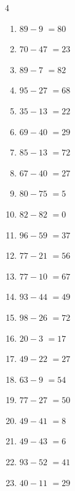 \begin{multicols}{4}
\begin{enumerate}
  \item $89-9$
        $=80$

  \item $70-47$
        $=23$

  \item $89-7$
        $=82$

  \item $95-27$
        $=68$

  \item $35-13$
        $=22$

  \item $69-40$
        $=29$

  \item $85-13$
        $=72$

  \item $67-40$
        $=27$

  \item $80-75$
        $=5$

  \item $82-82$
        $=0$

  \item $96-59$
        $=37$

  \item $77-21$
        $=56$

  \item $77-10$
        $=67$

  \item $93-44$
        $=49$

  \item $98-26$
        $=72$

  \item $20-3$
        $=17$

  \item $49-22$
        $=27$

  \item $63-9$
        $=54$

  \item $77-27$
        $=50$

\columnbreak %

  \item $49-41$
        $=8$

  \item $49-43$
        $=6$

  \item $93-52$
        $=41$

  \item $40-11$
        $=29$


\end{enumerate}
\end{multicols}
